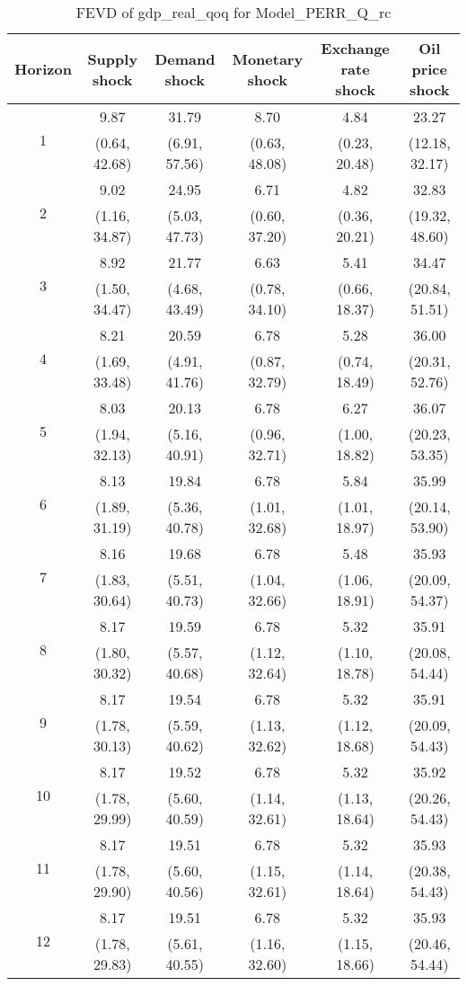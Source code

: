 \documentclass{article}
\begin{document}
\begin{table}
	\footnotesize
	\caption{FEVD of gdp_real_qoq for Model_PERR_Q_rc}
	\begin{tabular}{cccccc}
		Horizon & Supply shock & Demand shock & Monetary shock & Exchange rate shock & Oil price shock\\ \hline
		\multirow{2}{*}{1} & 9.87 & 31.79 & 8.70 & 4.84 & 23.27\\
		 & (0.64, 42.68) & (6.91, 57.56) & (0.63, 48.08) & (0.23, 20.48) & (12.18, 32.17)\\
		\multirow{2}{*}{2} & 9.02 & 24.95 & 6.71 & 4.82 & 32.83\\
		 & (1.16, 34.87) & (5.03, 47.73) & (0.60, 37.20) & (0.36, 20.21) & (19.32, 48.60)\\
		\multirow{2}{*}{3} & 8.92 & 21.77 & 6.63 & 5.41 & 34.47\\
		 & (1.50, 34.47) & (4.68, 43.49) & (0.78, 34.10) & (0.66, 18.37) & (20.84, 51.51)\\
		\multirow{2}{*}{4} & 8.21 & 20.59 & 6.78 & 5.28 & 36.00\\
		 & (1.69, 33.48) & (4.91, 41.76) & (0.87, 32.79) & (0.74, 18.49) & (20.31, 52.76)\\
		\multirow{2}{*}{5} & 8.03 & 20.13 & 6.78 & 6.27 & 36.07\\
		 & (1.94, 32.13) & (5.16, 40.91) & (0.96, 32.71) & (1.00, 18.82) & (20.23, 53.35)\\
		\multirow{2}{*}{6} & 8.13 & 19.84 & 6.78 & 5.84 & 35.99\\
		 & (1.89, 31.19) & (5.36, 40.78) & (1.01, 32.68) & (1.01, 18.97) & (20.14, 53.90)\\
		\multirow{2}{*}{7} & 8.16 & 19.68 & 6.78 & 5.48 & 35.93\\
		 & (1.83, 30.64) & (5.51, 40.73) & (1.04, 32.66) & (1.06, 18.91) & (20.09, 54.37)\\
		\multirow{2}{*}{8} & 8.17 & 19.59 & 6.78 & 5.32 & 35.91\\
		 & (1.80, 30.32) & (5.57, 40.68) & (1.12, 32.64) & (1.10, 18.78) & (20.08, 54.44)\\
		\multirow{2}{*}{9} & 8.17 & 19.54 & 6.78 & 5.32 & 35.91\\
		 & (1.78, 30.13) & (5.59, 40.62) & (1.13, 32.62) & (1.12, 18.68) & (20.09, 54.43)\\
		\multirow{2}{*}{10} & 8.17 & 19.52 & 6.78 & 5.32 & 35.92\\
		 & (1.78, 29.99) & (5.60, 40.59) & (1.14, 32.61) & (1.13, 18.64) & (20.26, 54.43)\\
		\multirow{2}{*}{11} & 8.17 & 19.51 & 6.78 & 5.32 & 35.93\\
		 & (1.78, 29.90) & (5.60, 40.56) & (1.15, 32.61) & (1.14, 18.64) & (20.38, 54.43)\\
		\multirow{2}{*}{12} & 8.17 & 19.51 & 6.78 & 5.32 & 35.93\\
		 & (1.78, 29.83) & (5.61, 40.55) & (1.16, 32.60) & (1.15, 18.66) & (20.46, 54.44)\\
	\end{tabular}
\label{tab:fevd-Model_PERR_Q_rc-gdp_real_qoq}
\end{table}
\end{document}
